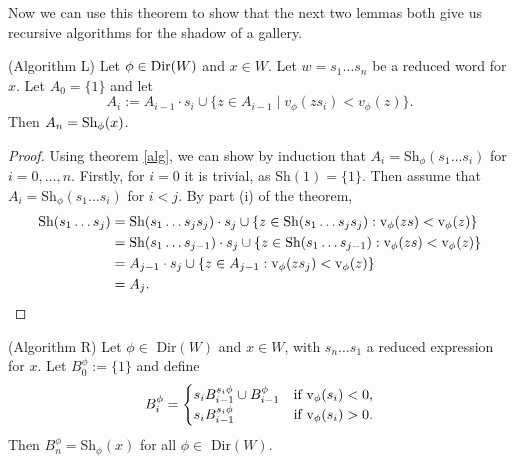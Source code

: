 \documentclass[11pt]{article}
\begin{document}
Now we can use this theorem to show that the next two lemmas both give us recursive algorithms for the shadow of a gallery. 

\begin{lemma} (Algorithm L)
    Let $\phi\in\textnormal{Dir}(W)$ and $x\in W$. Let $w=s_1\hdots s_n$ be a reduced word for $x$. Let $A_0=\{1\}$ and let
    \[A_i:=A_{i-1}\cdot s_i\cup \{z\in A_{i-1}\mid v_\phi(zs_i)<v_\phi(z)\}.\]
    Then $A_n=\textnormal{Sh}_\phi(x)$. 
\end{lemma}

\begin{proof}
    Using theorem \ref{alg}, we can show by induction that $A_i=$Sh$_\phi(s_1\hdots s_i)$ for $i=0,\hdots ,n$. Firstly, for $i=0$ it is trivial, as Sh$(1)=\{1\}$. Then assume that $A_i=$Sh$_\phi(s_1\hdots s_i)$ for $i<j$. By part (i) of the theorem,\[\begin{aligned}
    \textnormal{Sh}(s_1\hdots s_j)& = \textnormal{Sh}(s_1\hdots s_js_j)\cdot s_j \cup \{z\in \textnormal{Sh}(s_1\hdots s_js_j): \textnormal{v}_\phi(zs)<\textnormal{v}_\phi(z)\}\\
        & = \textnormal{Sh}(s_1\hdots s_{j-1})\cdot s_j \cup \{z\in \textnormal{Sh}(s_1\hdots s_{j-1}): \textnormal{v}_\phi(zs)<\textnormal{v}_\phi(z)\}\\
        & = A_{j-1}\cdot s_j \cup \{z\in A_{j-1}: \textnormal{v}_\phi(zs_j)<\textnormal{v}_\phi(z)\}\\
        & = A_j.
    \end{aligned}\]
\end{proof}

\begin{lemma} (Algorithm R)
    Let $\phi\in$ Dir$(W)$ and $x\in W$, with $s_n\hdots s_1$ a reduced expression for $x$. Let $B_0^\phi:=\{1\}$ and define
    \[B_i^\phi = \begin{cases}
        s_iB_{i-1}^{s_i\phi}\cup B_{i-1}^\phi & \textnormal{if v}_\phi(s_i)<0,\\
        s_iB_{i-1}^{s_i\phi} & \textnormal{if v}_\phi(s_i)>0.
    \end{cases}\]
    Then $B^\phi_n=$Sh$_\phi(x)$ for all $\phi\in$ Dir$(W)$. 
\end{lemma}
\end{document}
